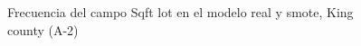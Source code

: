 \begin{figure}[H]
    \centering
    
    \caption{Frecuencia del campo Sqft lot en el modelo real y smote, King county (A-2)}
    \label{frecuency-smote-sqft lot}
\end{figure}